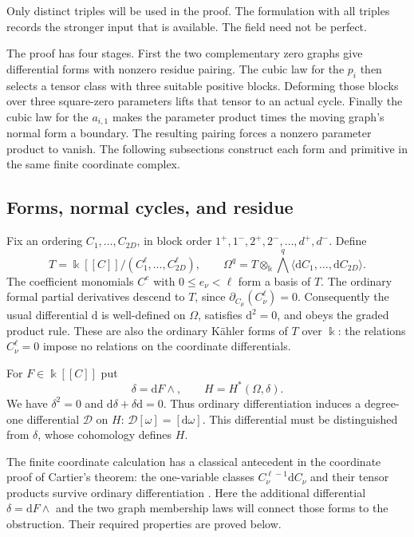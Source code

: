 Only distinct triples will be used in the proof.  The formulation with
all triples records the stronger input that is available. The field
need not be perfect.

The proof has four stages. First the two complementary zero graphs
give differential forms with nonzero residue pairing. The cubic
law for the $p_i$ then selects a tensor class with three suitable positive
blocks. Deforming those blocks over three square-zero parameters lifts
that tensor to an actual cycle. Finally the cubic law for the $a_{i,1}$ makes
the parameter product times the moving graph's normal form a boundary.
The resulting pairing forces a nonzero parameter product to
vanish. The following subsections construct each form and primitive
in the same finite coordinate complex.

\subsection{Forms, normal cycles, and residue}
\label{frob:forms-subsection}

Fix an ordering $C_1,\ldots,C_{2D}$, in block order
$1^+,1^-,2^+,2^-,\ldots,d^+,d^-$.  Define
\begin{equation}
 T=\Bbbk[[C]]/(C_1^\ell,\ldots,C_{2D}^\ell),\qquad
 \Omega^q=T\otimes_{\Bbbk}
                 \bigwedge^q\langle\mathrm dC_1,\ldots,\mathrm dC_{2D}\rangle.
 \label{frob:quotient}
\end{equation}
The coefficient monomials $C^e$ with $0\leq e_\nu<\ell$ form a basis
of $T$.  The ordinary formal partial derivatives descend to $T$, since
$\partial_{C_\mu}(C_\nu^\ell)=0$.  Consequently the usual differential
$\mathrm d$ is well-defined on $\Omega$, satisfies $\mathrm d^2=0$, and
obeys the graded product rule.  These are also the ordinary K\"ahler
forms of $T$ over $\Bbbk$: the relations $C_\nu^\ell=0$ impose no
relations on the coordinate differentials.

For $F\in\Bbbk[[C]]$ put
\[
 \delta=\mathrm dF\wedge{},\qquad H=H^*(\Omega,\delta).
\]
We have $\delta^2=0$ and
$\mathrm d\delta+\delta\mathrm d=0$.  Thus ordinary differentiation
induces a degree-one differential $\mathcal D$ on $H$:
$\mathcal D[\omega]=[\mathrm d\omega]$.  This differential must be
distinguished from $\delta$, whose cohomology defines $H$.

The finite coordinate calculation has a classical antecedent in the
coordinate proof of Cartier's theorem: the one-variable classes
$C_\nu^{\ell-1}\mathrm dC_\nu$ and their tensor products survive
ordinary differentiation
\cite[Theorem~7.2 and (7.2.11)--(7.2.12)]{Katz1970}.
Here the additional differential $\delta=\mathrm dF\wedge{}$ and the
two graph membership laws will connect those forms to the obstruction.
Their required properties are proved below.

